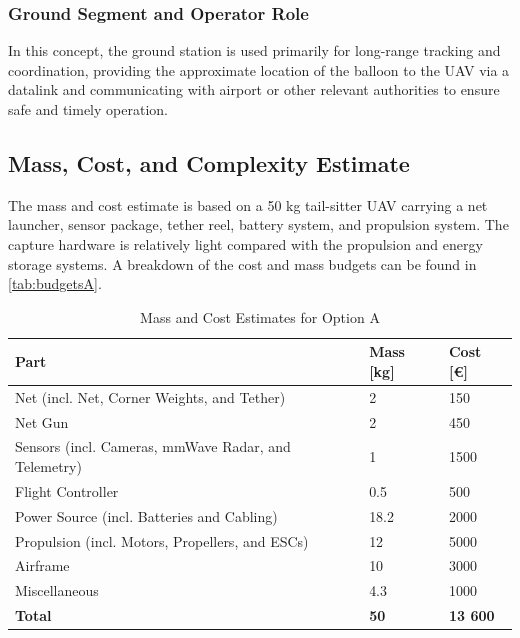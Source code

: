 \subsubsection{Ground Segment and Operator Role}
In this concept, the ground station is used primarily for long-range tracking and coordination, providing the approximate location of the balloon to the UAV via a datalink and communicating with airport or other relevant authorities to ensure safe and timely operation.




\subsection{Mass, Cost, and Complexity Estimate}

The mass and cost estimate is based on a 50 kg tail-sitter UAV carrying a net launcher, sensor package, tether reel, battery system, and propulsion system. The capture hardware is relatively light compared with the propulsion and energy storage systems. A breakdown of the cost and mass budgets can be found in \autoref{tab:budgetsA}.

\begin{table}[H]
\centering
\caption{Mass and Cost Estimates for Option A}
\label{tab:budgetsA}{%
\begin{tabular}{lll}
\hline
\textbf{Part}                                   & \textbf{Mass {[}kg{]}} & \textbf{Cost {[}€{]}} \\ \hline
Net (incl. Net, Corner Weights, and Tether)     & 2                      & 150                   \\
Net Gun                                         & 2                      & 450                   \\
Sensors (incl. Cameras, mmWave Radar, and Telemetry)  & 1                      & 1500                  \\
Flight Controller                               & 0.5                    & 500                   \\
Power Source (incl. Batteries and Cabling)     & 18.2                   & 2000                  \\
Propulsion (incl. Motors, Propellers, and ESCs) & 12                     & 5000                  \\
Airframe                                        & 10                     & 3000                  \\
Miscellaneous                                   & 4.3                    & 1000                  \\
\textbf{Total}                                  & \textbf{50}            & \textbf{13 600}       \\ \hline
\end{tabular}%
}
\end{table}

